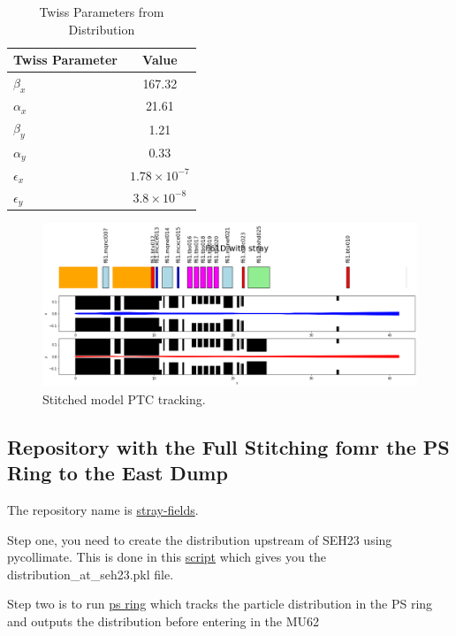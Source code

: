 \begin{table}[ht]
    \centering
    \caption{Twiss Parameters from Distribution}
    \begin{tabular}{l c}
        \hline
        \textbf{Twiss Parameter} & \textbf{Value} \\
        \hline
        $\beta_x$ & 167.32 \\
        $\alpha_x$ & 21.61 \\
        $\beta_y$ & 1.21 \\
        $\alpha_y$ & 0.33 \\
        $\epsilon_x$ & $1.78 \times 10^{-7}$ \\
        $\epsilon_y$ & $3.8 \times 10^{-8}$\\
        \hline
    \end{tabular}
    \label{tab:twiss_distribution}
\end{table}


\begin{figure}[H]
\centering
\includegraphics[width=1.0\textwidth]{02_Simulation/images/PTC_stray_field.png}
\caption{Stitched model PTC tracking.}
\label{fig:stitched_PTC}
\end{figure}

\subsection{Repository with the Full Stitching fomr the PS Ring to the East Dump}

The repository name is \href{https://gitlab.cern.ch/eljohnso/stray-fields}{stray-fields}. 

Step one, you need to create the distribution upstream of SEH23 using pycollimate. This is done in this \href{https://gitlab.cern.ch/eljohnso/stray-fields/-/blob/master/pycollimate.ipynb}{script} which gives you the distribution\_at\_seh23.pkl file.

Step two is to run \href{https://gitlab.cern.ch/eljohnso/stray-fields/-/blob/master/ps_ring.ipynb?ref_type=heads}{ps ring} which tracks the particle distribution in the PS ring and outputs the distribution before entering in the MU62

